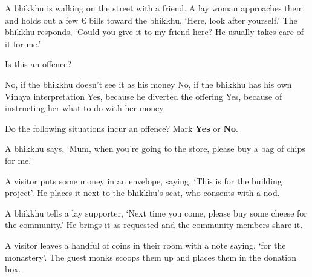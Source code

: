 \begin{exam}{\autoExamName}
\begin{problem*}
  \end{problem*}

  \problemDivide

  \begin{problem}

    A bhikkhu is walking on the street with a friend. A lay woman approaches
    them and holds out a few € bills toward the bhikkhu, `Here, look after
    yourself.' The bhikkhu responds, `Could you give it to my friend here? He
    usually takes care of it for me.'

    \bigskip

    Is this an offence?

    \bigskip

    \begin{answers}{1}
      \bChoices
       No, if the bhikkhu doesn't see it as his money\eAns
       No, if the bhikkhu has his own Vinaya interpretation\eAns
       Yes, because he diverted the offering\eAns
       Yes, because of instructing her what to do with her money\eAns
      \eChoices
    \end{answers}

  \end{problem}

  \problemDivide

  \begin{problem*}

    Do the following situations incur an offence? Mark \textbf{Yes} or \textbf{No}.

    \bigskip

    \begin{parts}

    \item {} A bhikkhu says, `Mum, when you're going to the store, please
    buy a bag of chips for me.'

    \item {} A visitor puts some money in an envelope, saying, `This is for
      the building project'. He places it next to the bhikkhu's seat, who
      consents with a nod.

    \item {} A bhikkhu tells a lay supporter, `Next time you come, please
      buy some cheese for the community.' He brings it as requested and the
      community members share it.

    \item {} A visitor leaves a handful of coins in their room with a note saying, `for the monastery'.
      The guest monks scoops them up and places them in the donation box.


\end{parts}
\end{problem*}
\end{exam}

